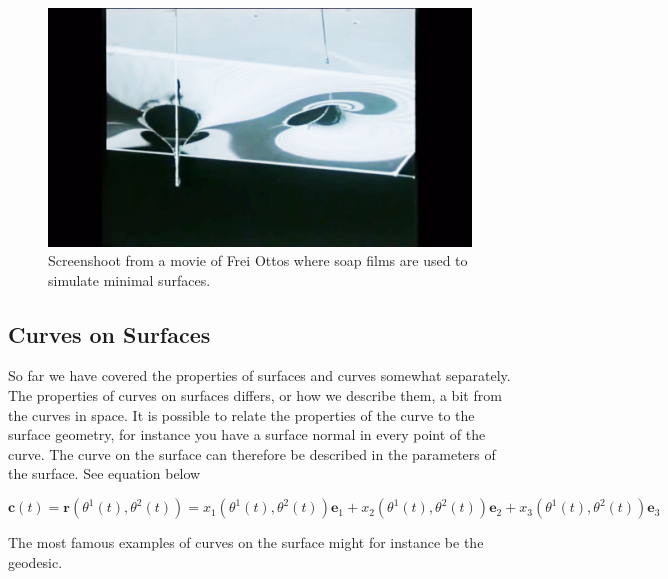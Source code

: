 \begin{figure}[H] 
\centering
\includegraphics[width=0.9\linewidth ]{figure/Theory/SoapSreeen.jpg}
\caption{Screenshoot from a movie of Frei Ottos \cite{ref:FreiOttoSoap} where soap films are used to simulate minimal surfaces.}
\end{figure}




\subsection{Curves on Surfaces}

So far we have covered the properties of surfaces and curves somewhat separately. The properties of curves on surfaces differs, or how we describe them, a bit from the curves in  space. It is possible to relate the properties of the curve to the surface geometry, for instance you have a surface normal in every point of the curve. The curve on the surface can therefore be described in the parameters of the surface. See equation below


\begin{equation}
\textbf{c}(t) =\textbf{r}(\theta^1(t),\theta^2(t))= x_1(\theta^1(t),\theta^2(t))\textbf{e}_1 +  x_2(\theta^1(t),\theta^2(t))\textbf{e}_2+  x_3(\theta^1(t),\theta^2(t))\textbf{e}_3
\end{equation}


The most famous examples of curves on the surface might for instance be the geodesic.

